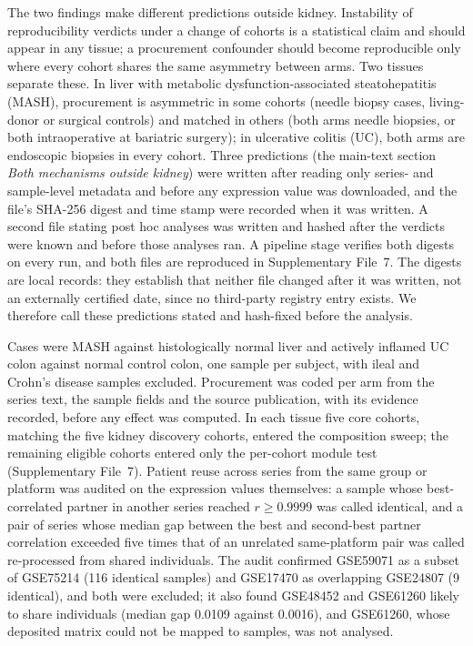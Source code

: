 \documentclass[11pt]{article}
\begin{document}
The two findings make different predictions outside kidney. Instability of reproducibility
verdicts under a change of cohorts is a statistical claim and should appear in any tissue; a
procurement confounder should become reproducible only where every cohort shares the same
asymmetry between arms. Two tissues separate these. In liver with metabolic
dysfunction-associated steatohepatitis (MASH), procurement is asymmetric in some cohorts (needle
biopsy cases, living-donor or surgical controls) and matched in others (both arms needle
biopsies, or both intraoperative at bariatric surgery); in ulcerative colitis (UC), both arms
are endoscopic biopsies in every cohort. Three predictions (the main-text section \textit{Both mechanisms outside kidney}) were
written after reading only series- and sample-level metadata and before any expression value was
downloaded, and the file's SHA-256 digest and time stamp were recorded when it was written. A
second file stating post hoc analyses was written and hashed after the verdicts were known and
before those analyses ran. A pipeline stage verifies both digests on every run, and both files
are reproduced in Supplementary File~7. The digests are local records: they establish that neither
file changed after it was written, not an externally certified date, since no third-party registry
entry exists. We therefore call these predictions stated and hash-fixed before the analysis.

Cases were MASH against histologically normal liver and actively inflamed UC colon against
normal control colon, one sample per subject, with ileal and Crohn's disease samples excluded.
Procurement was coded per arm from the series text, the sample fields and the source
publication, with its evidence recorded, before any effect was computed. In each tissue five
core cohorts, matching the five kidney discovery cohorts, entered the composition sweep; the
remaining eligible cohorts entered only the per-cohort module test (Supplementary File~7). Patient
reuse across series from the same group or platform was audited on the expression values
themselves: a sample whose best-correlated partner in another series reached $r \ge 0.9999$ was
called identical, and a pair of series whose median gap between the best and second-best partner
correlation exceeded five times that of an unrelated same-platform pair was called re-processed
from shared individuals. The audit confirmed GSE59071 as a subset of GSE75214 (116 identical
samples) and GSE17470 as overlapping GSE24807 (9 identical), and both were excluded; it also
found GSE48452 and GSE61260 likely to share individuals (median gap 0.0109 against 0.0016), and
GSE61260, whose deposited matrix could not be mapped to samples, was not analysed.
\end{document}
